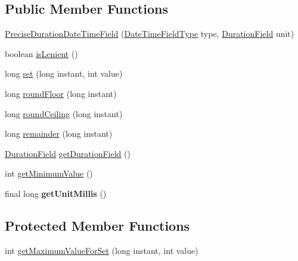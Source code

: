 \subsection*{Public Member Functions}
\begin{DoxyCompactItemize}
\item 
\hyperlink{classorg_1_1joda_1_1time_1_1field_1_1_precise_duration_date_time_field_a6e46951153aad46b2cd726492a90191c}{Precise\-Duration\-Date\-Time\-Field} (\hyperlink{classorg_1_1joda_1_1time_1_1_date_time_field_type}{Date\-Time\-Field\-Type} type, \hyperlink{classorg_1_1joda_1_1time_1_1_duration_field}{Duration\-Field} unit)
\item 
boolean \hyperlink{classorg_1_1joda_1_1time_1_1field_1_1_precise_duration_date_time_field_a85b01bffa55139594a93ef570fdceef8}{is\-Lenient} ()
\item 
long \hyperlink{classorg_1_1joda_1_1time_1_1field_1_1_precise_duration_date_time_field_a63efdad90991a9b49b3bb51b0677f4d8}{set} (long instant, int value)
\item 
long \hyperlink{classorg_1_1joda_1_1time_1_1field_1_1_precise_duration_date_time_field_ad751284833564660913d259c7cfd3e48}{round\-Floor} (long instant)
\item 
long \hyperlink{classorg_1_1joda_1_1time_1_1field_1_1_precise_duration_date_time_field_ab09da9215d47784c96aee26771341fc5}{round\-Ceiling} (long instant)
\item 
long \hyperlink{classorg_1_1joda_1_1time_1_1field_1_1_precise_duration_date_time_field_a8b371a2503ee7e339e6d5adae2362327}{remainder} (long instant)
\item 
\hyperlink{classorg_1_1joda_1_1time_1_1_duration_field}{Duration\-Field} \hyperlink{classorg_1_1joda_1_1time_1_1field_1_1_precise_duration_date_time_field_ab2f36f4618fdf74968a4e8ae3cafbcdf}{get\-Duration\-Field} ()
\item 
int \hyperlink{classorg_1_1joda_1_1time_1_1field_1_1_precise_duration_date_time_field_ab41ba15a6ada18e5c19284cbdb701b9c}{get\-Minimum\-Value} ()
\item 
\hypertarget{classorg_1_1joda_1_1time_1_1field_1_1_precise_duration_date_time_field_ae53cd1815798b4c285bb206a1e4f39e8}{final long {\bfseries get\-Unit\-Millis} ()}\label{classorg_1_1joda_1_1time_1_1field_1_1_precise_duration_date_time_field_ae53cd1815798b4c285bb206a1e4f39e8}

\end{DoxyCompactItemize}
\subsection*{Protected Member Functions}
\begin{DoxyCompactItemize}
\item 
int \hyperlink{classorg_1_1joda_1_1time_1_1field_1_1_precise_duration_date_time_field_a4902d3940fa9ab0c3667d0e117088d12}{get\-Maximum\-Value\-For\-Set} (long instant, int value)
\end{DoxyCompactItemize}



